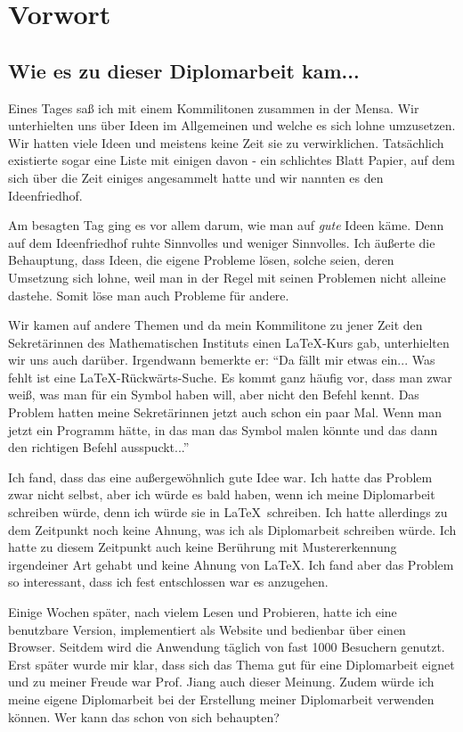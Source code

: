 \chapter{Vorwort}

\section*{Wie es zu dieser Diplomarbeit kam...}

Eines Tages saß ich mit einem Kommilitonen zusammen in der Mensa. Wir unterhielten uns über Ideen im Allgemeinen und welche es sich lohne umzusetzen. Wir hatten viele Ideen und meistens keine Zeit sie zu verwirklichen. Tatsächlich existierte sogar eine Liste mit einigen davon - ein schlichtes Blatt Papier, auf dem sich über die Zeit einiges angesammelt hatte und wir nannten es den Ideenfriedhof.

Am besagten Tag ging es vor allem darum, wie man auf {\em gute} Ideen käme. Denn auf dem Ideenfriedhof ruhte Sinnvolles und weniger Sinnvolles. Ich äußerte die Behauptung, dass Ideen, die eigene Probleme lösen, solche seien, deren Umsetzung sich lohne, weil man in der Regel mit seinen Problemen nicht alleine dastehe. Somit löse man auch Probleme für andere.

Wir kamen auf andere Themen und da mein Kommilitone zu jener Zeit den Sekretärinnen des Mathematischen Instituts einen \LaTeX-Kurs gab, unterhielten wir uns auch darüber. Irgendwann bemerkte er: "`Da fällt mir etwas ein... Was fehlt ist eine \LaTeX-Rückwärts-Suche. Es kommt ganz häufig vor, dass man zwar weiß, was man für ein Symbol haben will, aber nicht den Befehl kennt. Das Problem hatten meine Sekretärinnen jetzt auch schon ein paar Mal. Wenn man jetzt ein Programm hätte, in das man das Symbol malen könnte und das dann den richtigen Befehl ausspuckt..."'

Ich fand, dass das eine außergewöhnlich gute Idee war. Ich hatte das Problem zwar nicht selbst, aber ich würde es bald haben, wenn ich meine Diplomarbeit schreiben würde, denn ich würde sie in \LaTeX\ schreiben. Ich hatte allerdings zu dem Zeitpunkt noch keine Ahnung, was ich als Diplomarbeit schreiben würde. Ich hatte zu diesem Zeitpunkt auch keine Berührung mit Mustererkennung irgendeiner Art gehabt und keine Ahnung von \LaTeX. Ich fand aber das Problem so interessant, dass ich fest entschlossen war es anzugehen.

Einige Wochen später, nach vielem Lesen und Probieren, hatte ich eine benutzbare Version, implementiert als Website und bedienbar über einen Browser. Seitdem wird die Anwendung täglich von fast 1000 Besuchern genutzt. Erst später wurde mir klar, dass sich das Thema gut für eine Diplomarbeit eignet und zu meiner Freude war Prof. Jiang auch dieser Meinung. Zudem würde ich meine eigene Diplomarbeit bei der Erstellung meiner Diplomarbeit verwenden können. Wer kann das schon von sich behaupten?

